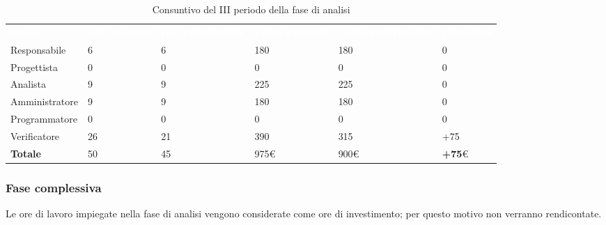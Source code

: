 \begin{table}[H]
\begin{center}
\renewcommand{\arraystretch}{1.5}
\begin{tabular}{ m{}<{\centering}  m{}<{\centering} m{}<{\centering} m{}<{\centering} m{}<{\centering} m{}<{\centering}}
	\rowcolor{darkblue}
	\textcolor{white}{\textbf{Ruolo}} & \textcolor{white}{\textbf{Ore Effettive}} & \textcolor{white}{\textbf{Ore Preventivate}}&\textcolor{white}{\textbf{Costo Effettivo}}&\textcolor{white}{\textbf{Costo Preventivato}}&\textcolor{white}{\textbf{Differenza}}\\  

	Responsabile  & 6 & 6 & 180 & 180 & 0\\	
	
	Progettista & 0 & 0 & 0 & 0 & 0\\
	
	Analista & 9 & 9 & 225 & 225 & 0\\
	
	Amministratore & 9 & 9 & 180 & 180 & 0\\
	
	Programmatore & 0 & 0 &0 &0 & 0\\
	
	Verificatore & 26 & 21 & 390 & 315 & +75\\
	
	\textbf{Totale} & 50 & 45 & 975\euro & 900\euro & \textbf{+75}\euro \\
	
\end{tabular}
\caption{Consuntivo del III periodo della fase di analisi}
\end{center}
\end{table}

\subsubsection{Fase complessiva}
Le ore di lavoro impiegate nella fase di analisi vengono considerate come ore di investimento; per questo motivo non verranno rendicontate.

